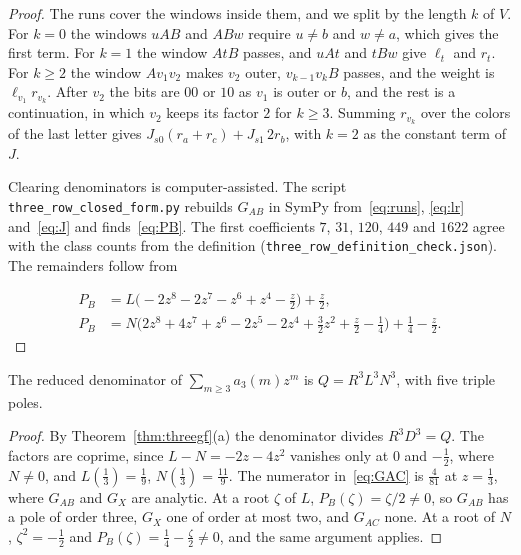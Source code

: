 \begin{proof}
The runs cover the windows inside them, and we split by the length $k$ of $V$. For $k=0$ the windows $uAB$ and $ABw$ require $u\ne b$ and
$w\ne a$, which gives the first term. For $k=1$ the window $AtB$ passes, and $uAt$ and $tBw$
give $\ell_t$ and $r_t$. For $k\ge2$ the window $Av_1v_2$ makes $v_2$ outer, $v_{k-1}v_kB$ passes,
and the weight is $\ell_{v_1}r_{v_k}$. After $v_2$ the bits are $00$ or $10$ as $v_1$ is outer or
$b$, and the rest is a continuation, in which $v_2$ keeps its factor $2$ for $k\ge3$. Summing
$r_{v_k}$ over the colors of the last letter gives $J_{s0}(r_a+r_c)+J_{s1}\,2r_b$, with $k=2$ as
the constant term of $J$.

Clearing denominators is computer-assisted. The script \nolinkurl{three_row_closed_form.py}
rebuilds $G_{AB}$ in SymPy from~\eqref{eq:runs}, \eqref{eq:lr} and~\eqref{eq:J} and
finds~\eqref{eq:PB}. The first coefficients $7$, $31$, $120$, $449$ and $1622$ agree with the
class counts from the definition (\texttt{three\_row\_definition\_check.json}). The remainders
follow from

\begin{align*}
P_B&=L\bigl(-2z^8-2z^7-z^6+z^4-\tfrac z2\bigr)+\tfrac z2,\\
P_B&=N\bigl(2z^8+4z^7+z^6-2z^5-2z^4+\tfrac32z^2+\tfrac z2-\tfrac14\bigr)+\tfrac14-\tfrac z2.
\end{align*}
\end{proof}

\begin{theorem}\label{thm:denominator}
The reduced denominator of $\sum_{m\ge3}a_3(m)z^m$ is $Q=R^3L^3N^3$, with five triple poles.
\end{theorem}

\begin{proof}
By Theorem~\ref{thm:threegf}(a) the denominator divides $R^3D^3=Q$. The factors are coprime,
since $L-N=-2z-4z^2$ vanishes only at $0$ and $-\frac12$, where $N\ne0$, and $L(\frac13)=\frac19$,
$N(\frac13)=\frac{11}9$. The numerator in~\eqref{eq:GAC} is $\frac4{81}$ at $z=\frac13$, where
$G_{AB}$ and $G_X$ are analytic. At a root $\zeta$ of $L$, $P_B(\zeta)=\zeta/2\ne0$, so $G_{AB}$
has a pole of order three, $G_X$ one of order at most two, and $G_{AC}$ none. At a root of $N$,
$\zeta^2=-\frac12$ and $P_B(\zeta)=\frac14-\frac\zeta2\ne0$, and the same argument applies.
\end{proof}
